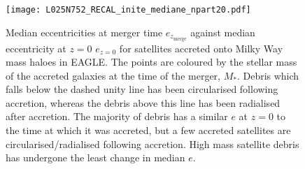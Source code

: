 \begin{figure}
\texttt{[image: L025N752\_RECAL\_inite\_mediane\_npart20.pdf]}
\caption{\label{fig:echange} Median eccentricities at merger time
$e_{z_\mathrm{merge}}$ against median eccentricity at $z=0$ $e_{z=0}$
for satellites accreted onto Milky Way mass haloes in EAGLE. The
points are coloured by the stellar mass of the accreted galaxies
at the time of the merger, $M_*$. Debris which falls below the
dashed unity line has been circularised following accretion, whereas
the debris above this line has been radialised after accretion. The
majority of debris has a similar $e$ at $z=0$ to the time at which
it was accreted, but a few accreted satellites are circularised/radialised
following accretion. High mass satellite debris has undergone the
least change in median $e$.}
\end{figure}


